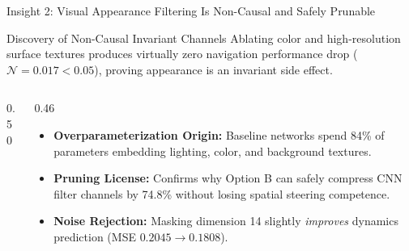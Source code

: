 \documentclass[aspectratio=169, 10pt]{beamer}
\begin{document}
\begin{frame}{Insight 2: Visual Appearance Filtering Is Non-Causal and Safely Prunable}
  \begin{block}{Discovery of Non-Causal Invariant Channels}
    Ablating color and high-resolution surface textures produces virtually zero navigation performance drop ($\mathcal{N} = 0.017 < 0.05$), proving appearance is an invariant side effect.
  \end{block}
  \vspace{-0.2cm}
  \begin{columns}[T]
    \begin{column}{0.50\textwidth}
      \centering
    \end{column}
    \begin{column}{0.46\textwidth}
      \begin{itemize}
        \item \textbf{Overparameterization Origin:} Baseline networks spend 84\% of parameters embedding lighting, color, and background textures.
        \item \textbf{Pruning License:} Confirms why Option B can safely compress CNN filter channels by 74.8\% without losing spatial steering competence.
        \item \textbf{Noise Rejection:} Masking dimension 14 slightly \emph{improves} dynamics prediction (MSE $0.2045 \to 0.1808$).
      \end{itemize}
    \end{column}
  \end{columns}
\end{frame}
\end{document}
